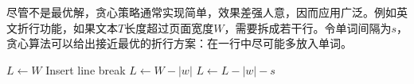 \documentclass[b5paper]{ctexart}
\begin{document}
尽管不是最优解，贪心策略通常实现简单，效果差强人意，因而应用广泛。例如英文折行功能，如果文本$T$长度超过页面宽度$W$，需要拆成若干行。令单词间隔为$s$，贪心算法可以给出接近最优的折行方案：在一行中尽可能多放入单词。

\begin{algorithmic}[1]
\State $L \gets W$
    \State Insert line break
    \State $L \gets W - |w|$
  \Else
    \State $L \gets L - |w| - s$
  \EndIf
\EndFor
\end{algorithmic}

\begin{Exercise}
\end{Exercise}
\end{document}
